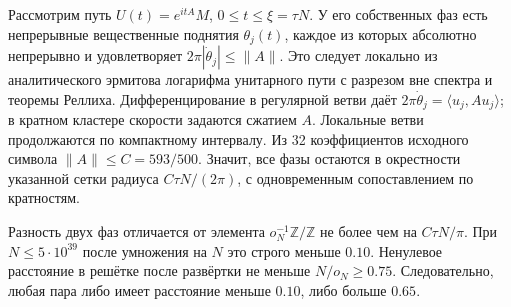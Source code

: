 \documentclass[11pt,a4paper]{article}
\newcommand{\Z}{\mathbb Z}
\begin{document}
Рассмотрим путь $U(t)=e^{itA}M$, $0\le t\le\xi=\tau N$. У его собственных фаз есть непрерывные вещественные поднятия $\theta_j(t)$, каждое из которых абсолютно непрерывно и удовлетворяет $2\pi|\dot\theta_j|\le\|A\|$. Это следует локально из аналитического эрмитова логарифма унитарного пути с разрезом вне спектра и теоремы Реллиха. Дифференцирование в регулярной ветви даёт $2\pi\dot\theta_j=\langle u_j,Au_j\rangle$; в кратном кластере скорости задаются сжатием $A$. Локальные ветви продолжаются по компактному интервалу. Из 32 коэффициентов исходного символа $\|A\|\le C=593/500$. Значит, все фазы остаются в окрестности указанной сетки радиуса $C\tau N/(2\pi)$, с одновременным сопоставлением по кратностям.

Разность двух фаз отличается от элемента $o_N^{-1}\Z/\Z$ не более чем на $C\tau N/\pi$. При $N\le5\cdot10^{39}$ после умножения на $N$ это строго меньше $0.10$. Ненулевое расстояние в решётке после развёртки не меньше $N/o_N\ge0.75$. Следовательно, любая пара либо имеет расстояние меньше $0.10$, либо больше $0.65$.
\end{document}
